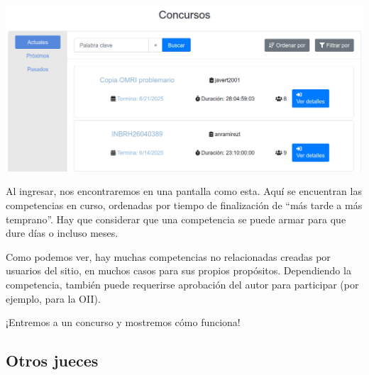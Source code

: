 \documentclass{beamer}
\begin{document}
    \begin{frame}[noframenumbering]
        \begin{center}
            \includegraphics[width=.8\linewidth]{./ou_contests.png}
        \end{center}\pause
        Al ingresar, nos encontraremos en una pantalla como esta. Aquí se encuentran las competencias en curso, ordenadas por tiempo de finalización de ``más tarde a más temprano''. Hay que considerar que una competencia se puede armar para que dure días o incluso meses. \pause

        Como podemos ver, hay muchas competencias no relacionadas creadas por usuarios del sitio, en muchos casos para sus propios propósitos. \pause Dependiendo la competencia, también puede requerirse aprobación del autor para participar (por ejemplo, para la OII).
    \end{frame}

    \begin{frame}[noframenumbering]
        \begin{center}
            \LARGE
            ¡Entremos a un concurso y mostremos cómo funciona!
        \end{center}
    \end{frame}
    
    \subsection{Otros jueces}
    \begin{frame}
    \end{frame}
\end{document}
